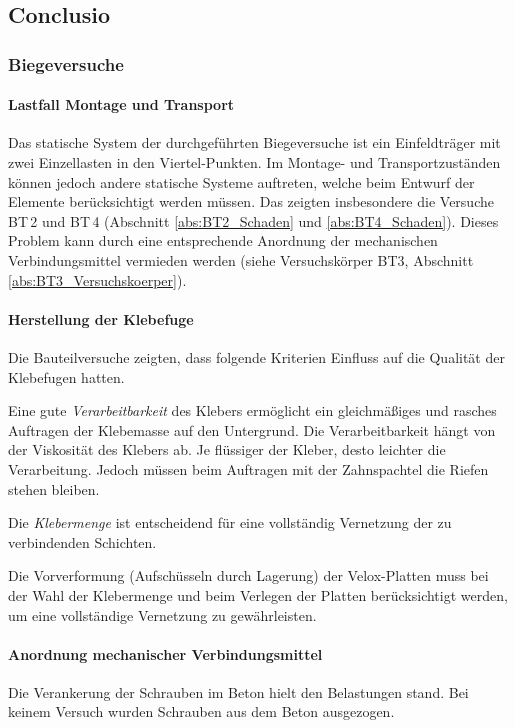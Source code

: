 \subsection{Conclusio}
\subsubsection{Biegeversuche}
\paragraph{Lastfall Montage und Transport}
Das statische System der durchgeführten Biegeversuche ist ein Einfeldträger mit zwei Einzellasten in den Viertel-Punkten. Im Montage- und Transportzuständen können jedoch andere statische Systeme auftreten, welche beim Entwurf der Elemente berücksichtigt werden müssen. Das zeigten insbesondere die Versuche BT\,2 und BT\,4  (Abschnitt \ref{abs:BT2_Schaden} und \ref{abs:BT4_Schaden}). Dieses Problem kann durch eine entsprechende Anordnung der mechanischen Verbindungsmittel vermieden werden (siehe Versuchskörper BT3, Abschnitt \ref{abs:BT3_Versuchskoerper}). 

\paragraph{Herstellung der Klebefuge}
Die Bauteilversuche zeigten, dass folgende Kriterien Einfluss auf die Qualität der Klebefugen hatten. 

Eine gute \textit{Verarbeitbarkeit} des Klebers ermöglicht ein gleichmäßiges und rasches Auftragen der Klebemasse auf den Untergrund. Die Verarbeitbarkeit hängt von der Viskosität des Klebers ab. Je flüssiger der Kleber, desto leichter die Verarbeitung. Jedoch müssen beim Auftragen mit der Zahnspachtel die Riefen stehen bleiben. 

Die \textit{Klebermenge} ist entscheidend für eine vollständig Vernetzung der zu verbindenden Schichten. %

Die Vorverformung (Aufschüsseln durch Lagerung) der Velox-Platten muss bei der Wahl der Klebermenge und beim Verlegen der Platten berücksichtigt werden, um eine vollständige Vernetzung zu gewährleisten.

\paragraph{Anordnung mechanischer Verbindungsmittel}

Die Verankerung der Schrauben im Beton hielt den Belastungen stand. 
Bei keinem Versuch wurden Schrauben aus dem Beton ausgezogen. 

